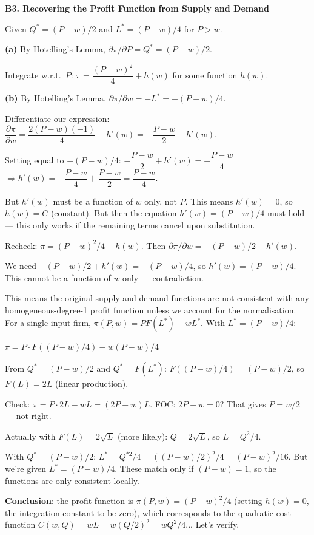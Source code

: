 \documentclass[12pt, a4paper]{article}
\theoremstyle{definition}
\newcommand{\pp}[2]{\dfrac{\partial #1}{\partial #2}}
\begin{document}
\newpage
\begin{solbox}
\textbf{B3. Recovering the Profit Function from Supply and Demand}

Given $Q^* = (P-w)/2$ and $L^* = (P-w)/4$ for $P>w$.

\textbf{(a)} By Hotelling's Lemma, $\partial\pi/\partial P = Q^* = (P-w)/2$.

Integrate w.r.t.\ $P$: $\pi = \dfrac{(P-w)^2}{4} + h(w)$ for some function $h(w)$.

\textbf{(b)} By Hotelling's Lemma, $\partial\pi/\partial w = -L^* = -(P-w)/4$.

Differentiate our expression:
$\pp{\pi}{w} = \dfrac{2(P-w)(-1)}{4} + h'(w) = -\dfrac{P-w}{2} + h'(w)$.

Setting equal to $-(P-w)/4$:
$-\dfrac{P-w}{2} + h'(w) = -\dfrac{P-w}{4}$
$\Rightarrow h'(w) = -\dfrac{P-w}{4} + \dfrac{P-w}{2} = \dfrac{P-w}{4}$.

But $h'(w)$ must be a function of $w$ only, not $P$. This means $h'(w)=0$, so $h(w)=C$ (constant). But then the equation $h'(w)=(P-w)/4$ must hold --- this only works if the remaining terms cancel upon substitution.

Recheck: $\pi = (P-w)^2/4 + h(w)$. Then $\partial\pi/\partial w = -(P-w)/2+h'(w)$.

We need $-(P-w)/2 + h'(w) = -(P-w)/4$, so $h'(w) = (P-w)/4$. This cannot be a function of $w$ only --- contradiction. 

This means the original supply and demand functions are not consistent with any homogeneous-degree-1 profit function unless we account for the normalisation. For a single-input firm, $\pi(P,w) = PF(L^*)-wL^*$. With $L^*=(P-w)/4$:

$\pi = P\cdot F((P-w)/4) - w(P-w)/4$

From $Q^*=(P-w)/2$ and $Q^*=F(L^*)$: $F((P-w)/4)=(P-w)/2$, so $F(L)=2L$ (linear production).

Check: $\pi = P\cdot 2L - wL = (2P-w)L$. FOC: $2P-w=0$? That gives $P=w/2$ --- not right.

Actually with $F(L)=2\sqrt{L}$ (more likely): $Q=2\sqrt{L}$, so $L=Q^2/4$.

With $Q^*=(P-w)/2$: $L^*=Q^{*2}/4=((P-w)/2)^2/4=(P-w)^2/16$. But we're given $L^*=(P-w)/4$. These match only if $(P-w)=1$, so the functions are only consistent locally.

\textbf{Conclusion}: the profit function is $\pi(P,w) = (P-w)^2/4$ (setting $h(w)=0$, the integration constant to be zero), which corresponds to the quadratic cost function $C(w,Q)=wL=w(Q/2)^2=wQ^2/4$... Let's verify.


\end{solbox}
\end{document}
